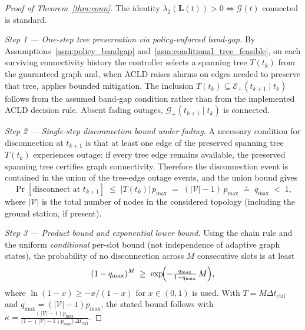 \documentclass[preprint,12pt]{elsarticle}
\theoremstyle{definition}\newtheorem{definition}{Definition}
\theoremstyle{plain}\newtheorem{theorem}{Theorem}
\theoremstyle{plain}\newtheorem{lemma}{Lemma}
\theoremstyle{plain}\newtheorem{corollary}{Corollary}
\theoremstyle{plain}\newtheorem{assumption}{Assumption}
\theoremstyle{remark}\newtheorem{remark}[theorem]{Remark}
\begin{document}
\begin{proof}[Proof of Theorem~\ref{thm:conn}]
The identity $\lambda_2(\boldsymbol L(t))>0 \Leftrightarrow \mathcal G(t)$ connected is standard.

\textit{Step 1 — One-step tree preservation via policy-enforced band-gap.}
By Assumptions~\ref{asm:policy_bandgap} and~\ref{asm:conditional_tree_feasible}, on each surviving connectivity history the controller selects a spanning tree $T(t_k)$ from the guaranteed graph
and, when ACLD raises alarms on edges needed to preserve that tree, applies bounded mitigation.
The inclusion $T(t_k)\subseteq \mathcal E_+(t_{k+1}\mid t_k)$ follows from the assumed band-gap condition rather than from the implemented ACLD decision rule.
Absent fading outages, $\mathcal G_+(t_{k+1}\mid t_k)$ is connected.

\textit{Step 2 — Single-step disconnection bound under fading.}
A necessary condition for disconnection at $t_{k+1}$ is that at least one edge of the preserved spanning tree $T(t_k)$ experiences outage: if every tree edge remains available, the preserved spanning tree certifies graph connectivity. Therefore the disconnection event is contained in the union of the tree-edge outage events, and the union bound gives
\[
  \Pr[\text{disconnect at }t_{k+1}] \;\le\; |T(t_k)|\,p_{\max} \;=\; (|\mathcal{V}|-1)\,p_{\max}
  \;\doteq\; q_{\max} \;<\;1,
\]
where $|\mathcal{V}|$ is the total number of nodes in the considered topology (including the ground station, if present).

\textit{Step 3 — Product bound and exponential lower bound.}
Using the chain rule and the uniform \emph{conditional} per-slot bound (not independence of adaptive graph states), the probability of no disconnection across $M$ consecutive slots is at least
\[
  (1-q_{\max})^{M} \;\ge\; \exp\!\Bigl(-\tfrac{q_{\max}}{1-q_{\max}}\,M\Bigr),
\]
where $\ln(1-x)\ge -x/(1-x)$ for $x\in(0,1)$ is used. With $T=M\Delta t_{\text{ctrl}}$ and $q_{\max}=(|\mathcal{V}|-1)p_{\max}$, the stated bound follows with
\(
  \kappa = \frac{(|\mathcal{V}|-1)p_{\max}}{\bigl(1-(|\mathcal{V}|-1)p_{\max}\bigr)\,\Delta t_{\text{ctrl}}}.
\)
\end{proof}
\end{document}
